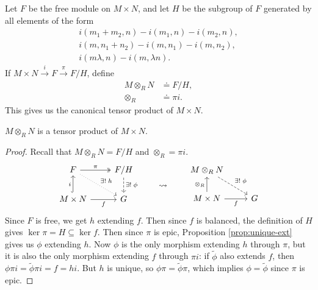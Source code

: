 \documentclass[twoside,10pt]{report}
\begin{document}
Let $F$ be the free module on $M \times N$, and let $H$ be the subgroup of $F$ generated by all elements of the form
\begin{align*}
	i(m_1+m_2,n) - i(m_1,n) - i(m_2,n),\\
	i(m,n_1+n_2) - i(m,n_1) - i(m,n_2),\\
	i(m\lambda,n) - i(m,\lambda n).
\end{align*}
If $M\times N \stackrel{i}{\to } F \stackrel{\pi}{\to } F/H$, define
\begin{align*}
	M \otimes_{R}N &\doteq F/H,\\
	\otimes_{R} &\doteq \pi i.
\end{align*}
This gives us the canonical tensor product of $M \times N$.

\begin{thrm}[Existence]
$M \otimes_{R}N$ is a tensor product of $M \times N$.
\end{thrm}
\begin{proof}
	Recall that $M \otimes_{R}N =F/H$ and $\otimes_{R} = \pi i$.
	\begin{equation*}
        \begin{aligned}[c]
        	\begin{tikzcd}
			F \rar[two heads]{\pi} \arrow[dr,dotted,"\exists!\;h"] & F/H \dar[dashed]{\exists!\;\phi} \\
			M\times N \uar[hook]{i}\rar["f"'] & G
		\end{tikzcd}
        \end{aligned}
        \qquad\leadsto\qquad
        \begin{aligned}[c]
                \begin{tikzcd}
			M \otimes_{R} N \arrow[dr,dashed,"\exists!\;\phi"] \\
			M\times N \uar{\otimes_{R}} \rar["f"'] & G
                \end{tikzcd}
        \end{aligned}
        \end{equation*}
	Since $F$ is free, we get $h$ extending $f$. Then since $f$ is balanced, the definition of $H$ gives $\ker \pi=H \subseteq \ker f$. Then since $\pi$ is epic, Proposition \ref{prop:unique-ext} gives us $\phi$ extending $h$. Now $\phi$ is the only morphism extending $h$ through $\pi$, but it is also the only morphism extending $f$ through $\pi i$: if $\tilde{\phi}$ also extends $f$, then $\phi \pi i = \tilde{\phi}\pi i = f = hi$. But $h$ is unique, so $\phi \pi=\tilde{\phi}\pi$, which implies $\phi=\tilde{\phi}$ since $\pi$ is epic.
\end{proof}
\end{document}
